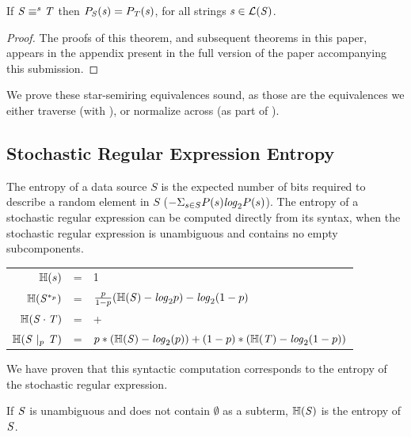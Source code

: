 \documentclass[acmsmall,screen,anonymous]{acmart}
\begin{document}
\begin{theorem}
  If $\mathit{S} \equiv^s \mathit{T}$ then $P_{\mathit{S}}(\mathit{s}) =
  P_{\mathit{T}}(\mathit{s})$, for all strings $\mathit{s} \in \mathcal{L}(\mathit{S})$.
\end{theorem}
\begin{proof}
  The proofs of this theorem, and subsequent theorems in this paper, appears in
  the appendix present in the full version of the paper accompanying this
  submission.
\end{proof}

We prove these star-semiring equivalences sound, as those are the equivalences
we either traverse (with \Expand), or normalize across (as part of
\GreedySynth).

\subsection{Stochastic Regular Expression Entropy}
The entropy of a data source $S$ is the expected number of bits required to
describe a random element in $S$ ($-\Sigma_{s\in S}P(s)\mathit{log}_2P(s)$). The entropy
of a stochastic regular expression can be computed directly from its syntax,
when the stochastic regular expression is unambiguous and contains no empty
subcomponents.
\begin{center}
  \begin{tabular}{rcl}
    $\mathbb{H}(s)$
    & =
    & 1\\
    
    $\mathbb{H}(\mathit{S}^{*_{p}})$
    & =
    & $\frac{p}{1-p}(\mathbb{H}(\mathit{S}) - \mathit{log}_2p)
      - \mathit{log}_2(1-p)$\\
    
    $\mathbb{H}({\mathit{S}\cdot\mathit{T}})$
    & =
    & \EntropyOf{\Regex} + \EntropyOf{\RegexAlt}\\
    
    $\mathbb{H}(\mathit{S}~|_{p}~\mathit{T})$
    & =
    & $p*(\mathbb{H}(\mathit{S}) - \mathit{log}_2(p)) + (1-p)*(\mathbb{H}(\mathit{T}) - \mathit{log}_2(1-p))$\\
  \end{tabular}
\end{center}
We have proven that this syntactic computation corresponds to the entropy of the
stochastic regular expression.

\begin{theorem}
  \label{thm:correct_entropy}
  If $\mathit{S}$ is unambiguous and does not contain $\emptyset$ as a subterm,
  $\mathbb{H}(\mathit{S})$ is the entropy of $\mathit{S}$.
\end{theorem}
\end{document}
